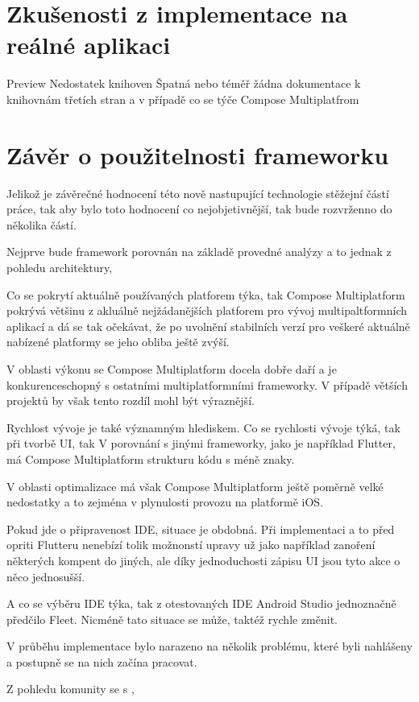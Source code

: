 \section{Zkušenosti z implementace na reálné aplikaci}
Preview
Nedostatek knihoven
Špatná nebo téměř žádna dokumentace k knihovnám třetích stran a v případě co se týče Compose Multiplatfrom
\section{Závěr o použitelnosti frameworku}
Jelikož je závěrečné hodnocení této nově nastupující technologie stěžejní částí práce, tak aby bylo toto hodnocení co 
nejobjetivnější, tak bude rozvrženno do několika částí.

Nejprve bude framework porovnán na základě provedné analýzy a to jednak z pohledu architektury, 

Co se pokrytí aktuálně používaných platforem týka, tak Compose Multiplatform pokrývá většinu z akluálně nejžádanějších 
platforem pro vývoj multipaltformních aplikací a dá se tak očekávat, že po uvolnění stabilních verzí pro veškeré 
aktuálně nabízené platformy se jeho obliba ještě zvýší. 

V oblasti výkonu se Compose Multiplatform docela dobře daří a je konkurenceschopný s ostatními multiplatformními frameworky.
V případě větších projektů by však tento rozdíl mohl být výraznější.

Rychlost vývoje je také významným hlediskem. 
Co se rychlosti vývoje týká, tak při tvorbě UI, tak V porovnání s jinými frameworky, jako je například Flutter, má Compose Multiplatform strukturu kódu s méně znaky.


V oblasti optimalizace má však Compose Multiplatform ještě poměrně velké nedostatky a to zejména v plynulosti provozu na 
platformě iOS.


Pokud jde o připravenost IDE, situace je obdobná.  Při implementaci a to před
opriti Flutteru nenebízí tolik možnonstí upravy už jako  například zanoření některých kompent do jiných, ale díky jednoduchosti
zápisu UI jsou tyto akce o něco jednosušší.

A co se výběru IDE týka, tak z otestovaných IDE Android Studio jednoznačně předčilo Fleet. Nicméně tato situace se může, 
taktéž rychle změnit.

V průběhu implementace bylo narazeno na několik problému, které byli nahlášeny a postupně se na nich začína pracovat.

Z pohledu komunity se s ,


